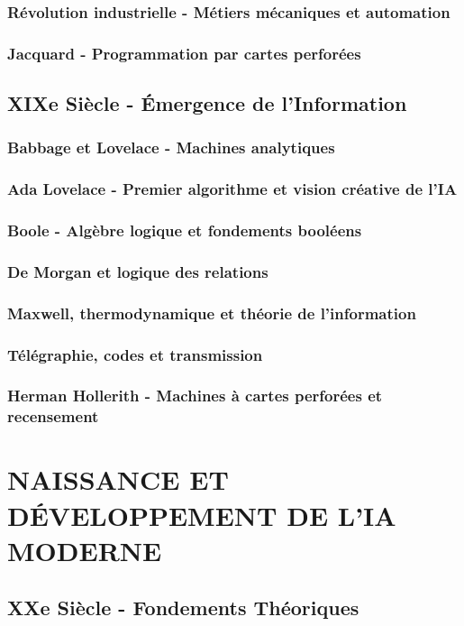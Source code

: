 \documentclass[12pt,a4paper]{book}
\begin{document}
\section{Révolution industrielle - Métiers mécaniques et automation}
\section{Jacquard - Programmation par cartes perforées}

\chapter{XIXe Siècle - Émergence de l'Information}
\section{Babbage et Lovelace - Machines analytiques}
\section{Ada Lovelace - Premier algorithme et vision créative de l'IA}
\section{Boole - Algèbre logique et fondements booléens}
\section{De Morgan et logique des relations}
\section{Maxwell, thermodynamique et théorie de l'information}
\section{Télégraphie, codes et transmission}
\section{Herman Hollerith - Machines à cartes perforées et recensement}

\part{NAISSANCE ET DÉVELOPPEMENT DE L'IA MODERNE}

\chapter{XXe Siècle - Fondements Théoriques}
\end{document}
